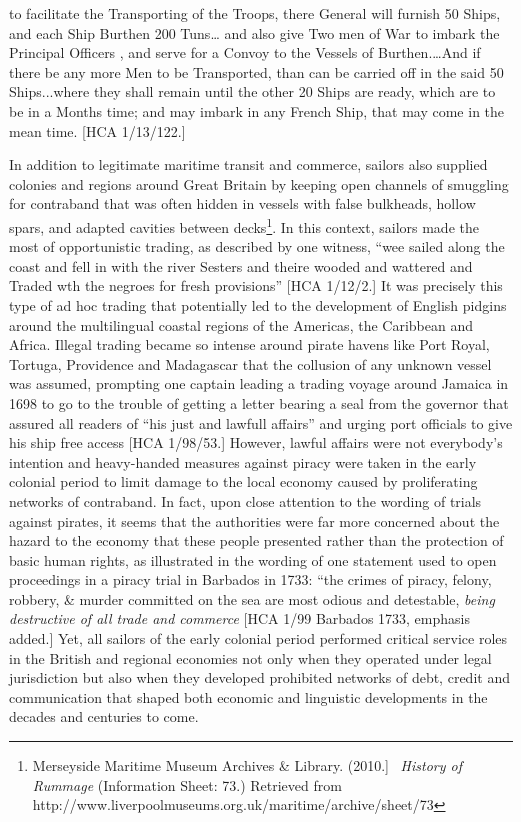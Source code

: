 \begin{styleStandard}
to facilitate the Transporting of the Troops, there General will furnish 50 Ships, and each Ship Burthen 200 Tuns… and also give Two men of War to imbark the Principal Officers , and serve for a Convoy to the Vessels of Burthen.…And if there be any more Men to be Transported, than can be carried off in the said 50 Ships...where they shall remain until the other 20 Ships are ready, which are to be in a Months time; and may imbark in any French Ship, that may come in the mean time. [HCA 1/13/122.]
\end{styleStandard}

\begin{styleStandard}
In addition to legitimate maritime transit and commerce, sailors also supplied colonies and regions around Great Britain by keeping open channels of smuggling for contraband that was often hidden in vessels with false bulkheads, hollow spars, and adapted cavities between decks\footnote{ Merseyside Maritime Museum Archives \& Library. (2010.] \ \textit{History of Rummage} (Information Sheet: 73.) Retrieved from http://www.liverpoolmuseums.org.uk/maritime/archive/sheet/73}. In this context, sailors made the most of opportunistic trading, as described by one witness, “wee sailed along the coast and fell in with the river Sesters and theire wooded and wattered and Traded wth the negroes for fresh provisions” [HCA 1/12/2.] It was precisely this type of ad hoc trading that potentially led to the development of English pidgins around the multilingual coastal regions of the Americas, the Caribbean and Africa. Illegal trading became so intense around pirate havens like Port Royal, Tortuga, Providence and Madagascar that the collusion of any unknown vessel was assumed, prompting one captain leading a trading voyage around Jamaica in 1698 to go to the trouble of getting a letter bearing a seal from the governor that assured all readers of “his just and lawfull affairs” and urging port officials to give his ship free access [HCA 1/98/53.] However, lawful affairs were not everybody’s intention and heavy-handed measures against piracy were taken in the early colonial period to limit damage to the local economy caused by proliferating networks of contraband. In fact, upon close attention to the wording of trials against pirates, it seems that the authorities were far more concerned about the hazard to the economy that these people presented rather than the protection of basic human rights, as illustrated in the wording of one statement used to open proceedings in a piracy trial in Barbados in 1733: “the crimes of piracy, felony, robbery, \& murder committed on the sea are most odious and detestable, \textit{being destructive of all trade and commerce}{\textquotedbl} [HCA 1/99 Barbados 1733, emphasis added.] Yet, all sailors of the early colonial period performed critical service roles in the British and regional economies not only when they operated under legal jurisdiction but also when they developed prohibited networks of debt, credit and communication that shaped both economic and linguistic developments in the decades and centuries to come. 
\end{styleStandard}

